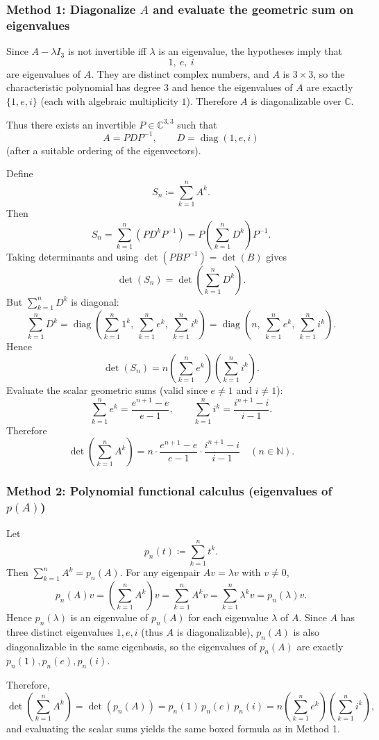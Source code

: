 \documentclass[12pt]{article}
\newcommand{\C}{\mathbb{C}}
\DeclareMathOperator{\diag}{diag}
\begin{document}
\subsubsection{Method 1: Diagonalize $A$ and evaluate the geometric sum on eigenvalues}
Since $A-\lambda I_3$ is not invertible iff $\lambda$ is an eigenvalue, the hypotheses imply that
\[
1,\ e,\ i
\]
are eigenvalues of $A$. They are distinct complex numbers, and $A$ is $3\times 3$, so the characteristic polynomial has degree $3$ and hence
the eigenvalues of $A$ are exactly $\{1,e,i\}$ (each with algebraic multiplicity $1$). Therefore $A$ is diagonalizable over $\C$.

Thus there exists an invertible $P\in\C^{3,3}$ such that
\[
A=PDP^{-1},
\qquad
D=\diag(1,e,i)
\]
(after a suitable ordering of the eigenvectors).

Define
\[
S_n\coloneqq \sum_{k=1}^{n}A^k.
\]
Then
\[
S_n=\sum_{k=1}^n (P D^k P^{-1}) = P\left(\sum_{k=1}^n D^k\right)P^{-1}.
\]
Taking determinants and using $\det(PBP^{-1})=\det(B)$ gives
\[
\det(S_n)=\det\!\left(\sum_{k=1}^n D^k\right).
\]
But $\sum_{k=1}^n D^k$ is diagonal:
\[
\sum_{k=1}^n D^k=\diag\!\left(\sum_{k=1}^n 1^k,\ \sum_{k=1}^n e^k,\ \sum_{k=1}^n i^k\right)
=\diag\!\left(n,\ \sum_{k=1}^n e^k,\ \sum_{k=1}^n i^k\right).
\]
Hence
\[
\det(S_n)=n\left(\sum_{k=1}^n e^k\right)\left(\sum_{k=1}^n i^k\right).
\]
Evaluate the scalar geometric sums (valid since $e\neq 1$ and $i\neq 1$):
\[
\sum_{k=1}^n e^k=\frac{e^{n+1}-e}{e-1},
\qquad
\sum_{k=1}^n i^k=\frac{i^{n+1}-i}{i-1}.
\]
Therefore
\[
\boxed{
\,
\det\!\left(\sum_{k=1}^{n}A^k\right)
=
n\cdot \frac{e^{n+1}-e}{e-1}\cdot \frac{i^{n+1}-i}{i-1}
\quad (n\in\mathbb{N}).
\,}
\]

\subsubsection{Method 2: Polynomial functional calculus (eigenvalues of $p(A)$)}
Let
\[
p_n(t)\coloneqq \sum_{k=1}^n t^k.
\]
Then $\sum_{k=1}^n A^k = p_n(A)$. For any eigenpair $A v=\lambda v$ with $v\neq 0$,
\[
p_n(A)v=\left(\sum_{k=1}^n A^k\right)v=\sum_{k=1}^n A^k v=\sum_{k=1}^n \lambda^k v=p_n(\lambda)v.
\]
Hence $p_n(\lambda)$ is an eigenvalue of $p_n(A)$ for each eigenvalue $\lambda$ of $A$.
Since $A$ has three distinct eigenvalues $1,e,i$ (thus $A$ is diagonalizable), $p_n(A)$ is also diagonalizable in the same eigenbasis,
so the eigenvalues of $p_n(A)$ are exactly $p_n(1),p_n(e),p_n(i)$.

Therefore,
\[
\det\!\left(\sum_{k=1}^n A^k\right)=\det(p_n(A))=p_n(1)\,p_n(e)\,p_n(i)
=n\left(\sum_{k=1}^n e^k\right)\left(\sum_{k=1}^n i^k\right),
\]
and evaluating the scalar sums yields the same boxed formula as in Method 1.
\end{document}
